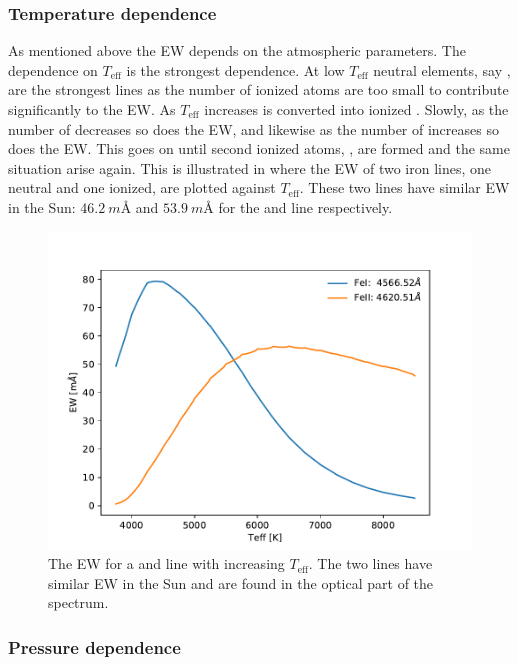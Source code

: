 \subsubsection{Temperature dependence}

As mentioned above the EW depends on the atmospheric parameters. The dependence
on $T_\mathrm{eff}$ is the strongest dependence. At low $T_\mathrm{eff}$ neutral
elements, say , are the strongest lines as the number of ionized
atoms are too small to contribute significantly to the EW. As $T_\mathrm{eff}$
increases  is converted into ionized . Slowly, as the
number of  decreases so does the EW, and likewise as the number of
 increases so does the EW. This goes on until second ionized atoms,
, are formed and the same situation arise again. This is
illustrated in  where the EW of two iron lines, one neutral and
one ionized, are plotted against $T_\mathrm{eff}$. These two lines have similar
EW in the Sun: $\SI{46.2}{m}$\AA{} and $\SI{53.9}{m}$\AA{} for the 
and  line respectively.

\begin{figure}[htpb!]
    \centering
    \includegraphics[width=1.0\linewidth]{figures/ewTeff.pdf}
    \caption{The EW for a  and  line with increasing
             $T_\mathrm{eff}$. The two lines have similar EW in the Sun and are
             found in the optical part of the spectrum.}
    \label{fig:ewTeff}
\end{figure}


\subsubsection{Pressure dependence}

